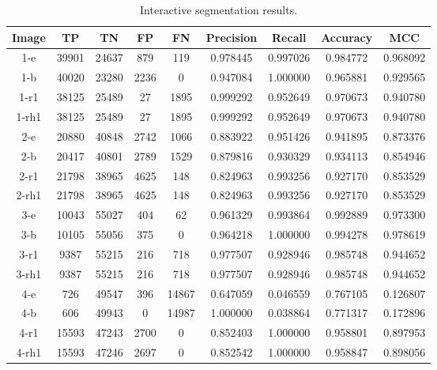 \clearpage
\begin{longtable}[!h]{|c|c|c|c|c|c|c|c|c|}
	\caption{Interactive segmentation results.} \label{tab:interactiveresults}\\
	\hline	Image	&	TP	&	TN	&	FP	&	FN	&	Precision	&	Recall	&	Accuracy	&	MCC	\\
	\hline \rowcolor{closest} 1-e	&	39901	&	24637	&	879	&	119	&	0.978445	&	0.997026	&	0.984772	&	0.968092	\\
	\hline \rowcolor{bad}	1-b	&	40020	&	23280	&	2236	&	0	&	0.947084	&	1.000000	&	0.965881	&	0.929565	\\
	\hline	1-r1	&	38125	&	25489	&	27	&	1895	&	0.999292	&	0.952649	&	0.970673	&	0.940780	\\
	\hline	1-rh1	&	38125	&	25489	&	27	&	1895	&	0.999292	&	0.952649	&	0.970673	&	0.940780	\\
	
	\hline \rowcolor{closest} 2-e	&	20880	&	40848	&	2742	&	1066	&	0.883922	&	0.951426	&	0.941895	&	0.873376	\\
	\hline	2-b	&	20417	&	40801	&	2789	&	1529	&	0.879816	&	0.930329	&	0.934113	&	0.854946	\\
	\hline \rowcolor{bad}	2-r1	&	21798	&	38965	&	4625	&	148	&	0.824963	&	0.993256	&	0.927170	&	0.853529	\\
	\hline \rowcolor{bad}	2-rh1	&	21798	&	38965	&	4625	&	148	&	0.824963	&	0.993256	&	0.927170	&	0.853529	\\
	
	\hline	3-e	&	10043	&	55027	&	404	&	62	&	0.961329	&	0.993864	&	0.992889	&	0.973300	\\
	\hline \rowcolor{closest}	3-b	&	10105	&	55056	&	375	&	0	&	0.964218	&	1.000000	&	0.994278	&	0.978619	\\
	\hline \rowcolor{bad}	3-r1	&	9387	&	55215	&	216	&	718	&	0.977507	&	0.928946	&	0.985748	&	0.944652	\\
	\hline \rowcolor{bad}	3-rh1	&	9387	&	55215	&	216	&	718	&	0.977507	&	0.928946	&	0.985748	&	0.944652	\\
	
	\hline \rowcolor{bad}	4-e	&	726	&	49547	&	396	&	14867	&	0.647059	&	0.046559	&	0.767105	&	0.126807	\\
	\hline	4-b	&	606	&	49943	&	0	&	14987	&	1.000000	&	0.038864	&	0.771317	&	0.172896	\\
	\hline	4-r1	&	15593	&	47243	&	2700	&	0	&	0.852403	&	1.000000	&	0.958801	&	0.897953	\\
	\hline \rowcolor{closest}	4-rh1	&	15593	&	47246	&	2697	&	0	&	0.852542	&	1.000000	&	0.958847	&	0.898056	\\
	

\end{longtable}
